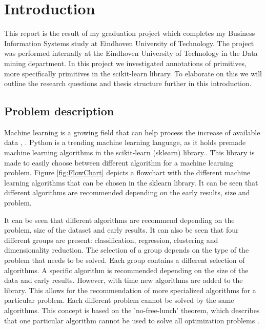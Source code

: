 \documentclass[a4paper,10pt]{article}
\begin{document}
\newpage
\tableofcontents
\newpage


\section{Introduction} \label{Chapter1}
This report is the result of my graduation project which completes my Business Information Systems study at Eindhoven University of Technology.
The project was performed internally at the Eindhoven University of Technology in the Data mining department.
In this project we investigated annotations of primitives, more specifically primitives in the scikit-learn library.
To elaborate on this we will outline the research questions and thesis structure further in this introduction.
 

\subsection{Problem description}\label{Intr-Prob}
Machine learning is a growing field that can help process the increase of available data \cite{Big-data}, \cite{ML-trends}. Python is a trending machine learning language, as it holds premade machine learning algorithms in the scikit-learn (sklearn) library.\cite{python-pop}. This library is made to easily choose between different algorithm for a machine learning problem. Figure \ref{fig:FlowChart} depicts a flowchart with the different machine learning algorithms that can be chosen in the sklearn library. It can be seen that different algorithms are recommended depending on the early results, size and problem.
 
 It can be seen that different algorithms are recommend depending on the problem, size of the dataset and early results. 
 It can also be seen that four different groups are present: classification, regression, clustering and dimensionality reduction. The selection of a group depends on the type of the problem that needs to be solved. Each group contains a different selection of algorithms. A specific algorithm is recommended depending on the size of the data and early results.
 However, with time new algorithms are added to the library. This allows for the recommendation of more specialized algorithms for a particular problem. Each different problem cannot be solved by the same algorithms. This concept is based on the 'no-free-lunch' theorem, which describes that one particular algorithm cannot be used to solve all optimization problems \cite{No-Free-Lunch}.  

 
\end{document}
